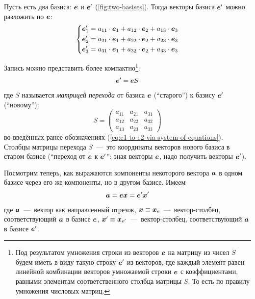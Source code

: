 \documentclass[a4paper,12pt]{article}
\begin{document}
  Пусть есть два базиса: $\boldsymbol e$ и $\boldsymbol e'$ (\ref{fig:two-basises}).
  Тогда векторы базиса $\boldsymbol e'$ можно разложить по $\boldsymbol e$:
  \begin{equation}\label{eq:e1-to-e2-via-system-of-equations}
    \left\{
      \begin{aligned}
        &\boldsymbol e_1' = a_{11} \cdot \boldsymbol e_1 + a_{12} \cdot \boldsymbol e_2 + a_{13} \cdot \boldsymbol e_3\\
        &\boldsymbol e_2' = a_{21} \cdot \boldsymbol e_1 + a_{22} \cdot \boldsymbol e_2 + a_{23} \cdot \boldsymbol e_3\\
        &\boldsymbol e_3' = a_{31} \cdot \boldsymbol e_1 + a_{32} \cdot \boldsymbol e_2 + a_{33} \cdot \boldsymbol e_3
      \end{aligned}
    \right.
  \end{equation}
  
  Запись можно представить более компактно\footnote{Под результатом умножения строки из векторов $\boldsymbol e$ на матрицу из чисел $S$ будем иметь в виду такую строку $\boldsymbol e'$ из векторов, где каждый элемент равен линейной комбинации векторов умножаемой строки $\boldsymbol e$ с коэффициентами, равными элементам соответственного столбца матрицы $S$. То есть по правилу умножения числовых матриц.}:
  \[
    \boldsymbol e' = \boldsymbol e S
  \]
  где $S$ называется \emph{матрицей перехода} от базиса $\boldsymbol e$ (``старого'') к базису $\boldsymbol e'$ (``новому''):
  \[
    S = \begin{pmatrix}
      a_{11} & a_{21} & a_{31}\\
      a_{12} & a_{22} & a_{32}\\
      a_{13} & a_{23} & a_{33}
    \end{pmatrix}
  \]
  во введённых ранее обозначениях (\ref{eq:e1-to-e2-via-system-of-equations}).
  Столбцы матрицы перехода $S$~---~это координаты векторов нового базиса в старом базисе (``переход от $\boldsymbol e$ к $\boldsymbol e'$'': зная векторы $\boldsymbol e$, надо получить векторы $\boldsymbol e'$).
  
  Посмотрим теперь, как выражаются компоненты некоторого вектора $\boldsymbol a$ в одном базисе через его же компоненты, но в другом базисе.
  Имеем
  \begin{equation}\label{eq:same-vector-two-faces}
    \boldsymbol a = \boldsymbol e \boldsymbol x = \boldsymbol e' \boldsymbol x'
  \end{equation}
  где $\boldsymbol a$~---~вектор как направленный отрезок,
  $\bds x \hm\equiv \bds x_e$~---~вектор-столбец, соответствующий $\boldsymbol a$ в базисе $\boldsymbol e$,
  $\bds x' \hm\equiv \bds x_{e'}$~---~вектор-столбец, соответствующий $\boldsymbol a$ в базисе $\boldsymbol e'$.
  
\end{document}
